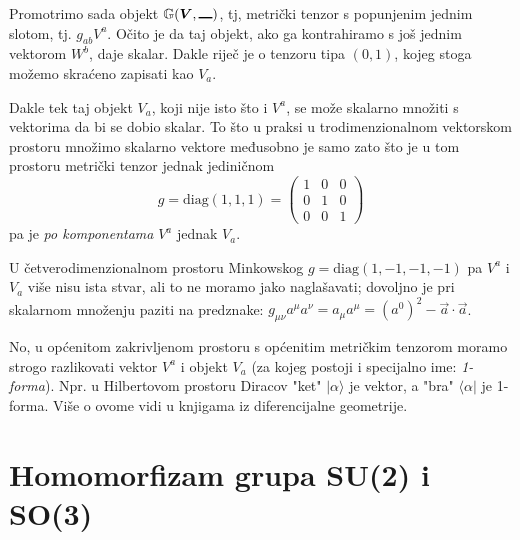 Promotrimo sada objekt  $\bbtensor{G}(\vec{V},\slot)$, tj, metrički
tenzor s popunjenim jednim slotom, tj. $g_{ab}V^a$. Očito je da
taj objekt, ako ga kontrahiramo s još jednim vektorom $W^{b}$, daje skalar.
Dakle riječ je o tenzoru tipa $(0, 1)$, kojeg stoga možemo skraćeno
zapisati kao $V_a$.

Dakle tek taj objekt $V_a$, koji nije isto što i $V^a$, se može
skalarno množiti s vektorima da bi se dobio skalar. To što u praksi
u trodimenzionalnom vektorskom prostoru množimo skalarno vektore
međusobno je samo zato što je u tom prostoru metrički tenzor
jednak jediničnom  
\begin{displaymath}
g = \text{diag}(1, 1, 1) =
\begin{pmatrix}
1 & 0 & 0 \\ 0 & 1 & 0 \\ 0 & 0 & 1
\end{pmatrix}
\end{displaymath}
pa je \emph{po komponentama} $V^a$ jednak $V_a$.

U četverodimenzionalnom prostoru Minkowskog 
$g = \text{diag}(1, -1, -1, -1)$ pa $V^a$ i $V_a$ više nisu
ista stvar, ali to ne moramo jako naglašavati; dovoljno je
pri skalarnom množenju paziti na predznake:
$g_{\mu \nu} a^{\mu} a^{\nu} = a_{\mu} a^{\mu} = (a^{0})^2 
- \vec{a}\cdot\vec{a}$.

No, u općenitom zakrivljenom prostoru s općenitim metričkim
tenzorom moramo strogo razlikovati vektor $V^a$ i objekt
$V_a$ (za kojeg postoji i specijalno ime: \emph{1-forma}).
Npr. u Hilbertovom prostoru Diracov "ket" $|\alpha\rangle$ je
vektor, a "bra" $\langle\alpha|$ je 1-forma. Više o ovome
vidi u knjigama iz diferencijalne geometrije.

\chapter{Homomorfizam grupa SU(2) i SO(3)}
\label{sec:su2so3}


